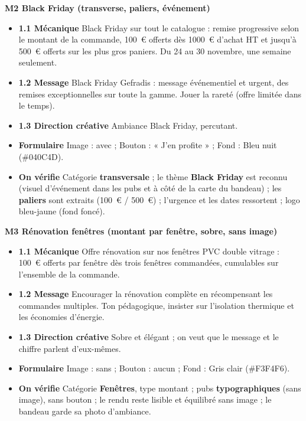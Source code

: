 \documentclass[11pt,a4paper]{article}
\begin{document}
\textbf{M2 \textbullet{} Black Friday (transverse, paliers, événement)}
\begin{itemize}[leftmargin=1.4em]
  \item \textbf{1.1 Mécanique} Black Friday sur tout le catalogue : remise progressive
        selon le montant de la commande, 100~€ offerts dès 1000~€ d'achat HT et jusqu'à
        500~€ offerts sur les plus gros paniers. Du 24 au 30 novembre, une semaine seulement.
  \item \textbf{1.2 Message} Black Friday Gefradis : message événementiel et urgent, des
        remises exceptionnelles sur toute la gamme. Jouer la rareté (offre limitée dans le temps).
  \item \textbf{1.3 Direction créative} Ambiance Black Friday, percutant.
  \item \textbf{Formulaire} Image : avec ; Bouton : « J'en profite » ; Fond : Bleu nuit (\#040C4D).
  \item \textbf{On vérifie} Catégorie \textbf{transversale} ; le thème \textbf{Black Friday}
        est reconnu (visuel d'événement dans les pubs et à côté de la carte du bandeau) ;
        les \textbf{paliers} sont extraits (100~€ / 500~€) ; l'urgence et les dates ressortent ;
        logo bleu-jaune (fond foncé).
\end{itemize}

\textbf{M3 \textbullet{} Rénovation fenêtres (montant par fenêtre, sobre, sans image)}
\begin{itemize}[leftmargin=1.4em]
  \item \textbf{1.1 Mécanique} Offre rénovation sur nos fenêtres PVC double vitrage :
        100~€ offerts par fenêtre dès trois fenêtres commandées, cumulables sur l'ensemble
        de la commande.
  \item \textbf{1.2 Message} Encourager la rénovation complète en récompensant les
        commandes multiples. Ton pédagogique, insister sur l'isolation thermique et les
        économies d'énergie.
  \item \textbf{1.3 Direction créative} Sobre et élégant ; on veut que le message et le
        chiffre parlent d'eux-mêmes.
  \item \textbf{Formulaire} Image : sans ; Bouton : aucun ; Fond : Gris clair (\#F3F4F6).
  \item \textbf{On vérifie} Catégorie \textbf{Fenêtres}, type montant ; pubs
        \textbf{typographiques} (sans image), sans bouton ; le rendu reste lisible et
        équilibré sans image ; le bandeau garde sa photo d'ambiance.
\end{itemize}
\end{document}

